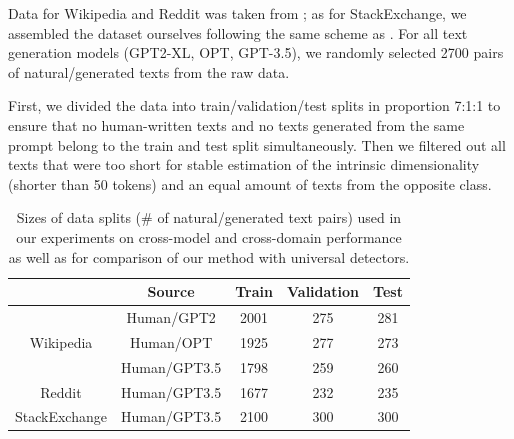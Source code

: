 \documentclass{article}
\begin{document}
Data for Wikipedia and Reddit was taken from \citep{krishna2023paraphrasing}; as for StackExchange, we assembled the dataset ourselves following the same scheme as \citet{krishna2023paraphrasing}. For all text generation models (GPT2-XL, OPT, GPT-3.5), we randomly selected 2700 pairs of natural/generated texts from the raw data.

First, we divided the data into train/validation/test splits in proportion 7:1:1 to ensure that no human-written texts and no texts generated from the same prompt belong to the train and test split simultaneously. Then we filtered out all texts that were too short for stable estimation of the intrinsic dimensionality (shorter than 50 tokens) and an equal amount of texts from the opposite class.

\begin{table}[!t]
    \centering
        \caption{Sizes of data splits (\# of natural/generated text pairs) used in our experiments on cross-model and cross-domain performance as well as for comparison of our method with universal detectors.}
    \label{tab:superwised_datasets}
    \begin{tabular}{cc|ccc}
    \toprule
         & Source & Train & Validation & Test \\
         \midrule
        \multirow{3}{*}{Wikipedia}& Human/GPT2 & 2001 & 275 & 281 \\
        & Human/OPT & 1925 & 277 & 273 \\
        & Human/GPT3.5 & 1798 & 259 & 260 \\
        \midrule
        \multirow{1}{*}{Reddit} & Human/GPT3.5  & 1677 & 232 & 235 \\
        \midrule
        \multirow{1}{*}{StackExchange} & Human/GPT3.5 & 2100 & 300 & 300 \\
         \bottomrule
    \end{tabular}
\end{table}
\end{document}
